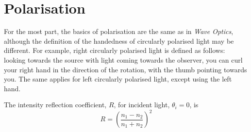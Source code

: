 \section{Polarisation}
%
%
%
For the most part, the basics of polarisation are the same as in \textit{Wave Optics}, although the definition of the handedness of circularly polarised light may be different.
 For example, right circularly polarised light is defined as follows: looking towards the source with light coming towards the observer, you can curl your right hand in the direction of the rotation, with the thumb pointing towards you.
 The same applies for left circularly polarised light, except using the left hand.
\par
The intensity reflection coefficient, $R$, for incident light, $\theta_i = 0$, is
\begin{equation}
	R = \left(\frac{n_1-n_2}{n_1+n_2}\right)^2
\end{equation}
 


